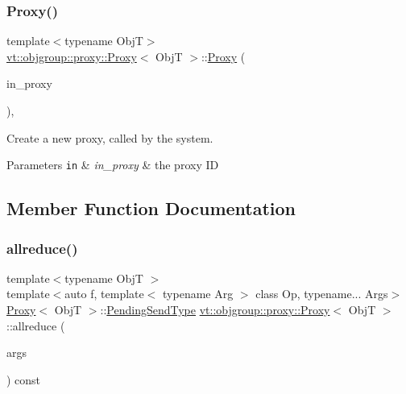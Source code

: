 \subsubsection{\texorpdfstring{Proxy()}{Proxy()}\hspace{0.1cm}{\footnotesize\ttfamily [4/4]}}
{\footnotesize\ttfamily template$<$typename ObjT$>$ \\
\hyperlink{structvt_1_1objgroup_1_1proxy_1_1_proxy}{vt\+::objgroup\+::proxy\+::\+Proxy}$<$ ObjT $>$\+::\hyperlink{structvt_1_1objgroup_1_1proxy_1_1_proxy}{Proxy} (\begin{DoxyParamCaption}\item[{\hyperlink{namespacevt_ad7cae989df485fccca57f0792a880a8e}{Obj\+Group\+Proxy\+Type}}]{in\+\_\+proxy }\end{DoxyParamCaption})\hspace{0.3cm}{\ttfamily [inline]}, {\ttfamily [explicit]}}



Create a new proxy, called by the system. 


\begin{DoxyParams}[1]{Parameters}
\mbox{\tt in}  & {\em in\+\_\+proxy} & the proxy ID \\
\hline
\end{DoxyParams}


\subsection{Member Function Documentation}
\mbox{\label{structvt_1_1objgroup_1_1proxy_1_1_proxy_ab8d4b9337c19d4ff0e758d03f3941b98}} 
\subsubsection{\texorpdfstring{allreduce()}{allreduce()}}
{\footnotesize\ttfamily template$<$typename ObjT $>$ \\
template$<$auto f, template$<$ typename Arg $>$ class Op, typename... Args$>$ \\
\hyperlink{structvt_1_1objgroup_1_1proxy_1_1_proxy}{Proxy}$<$ ObjT $>$\+::\hyperlink{structvt_1_1objgroup_1_1proxy_1_1_proxy_a1bdf8713203531d306702a024872bb08}{Pending\+Send\+Type} \hyperlink{structvt_1_1objgroup_1_1proxy_1_1_proxy}{vt\+::objgroup\+::proxy\+::\+Proxy}$<$ ObjT $>$\+::allreduce (\begin{DoxyParamCaption}\item[{Args \&\&...}]{args }\end{DoxyParamCaption}) const}



